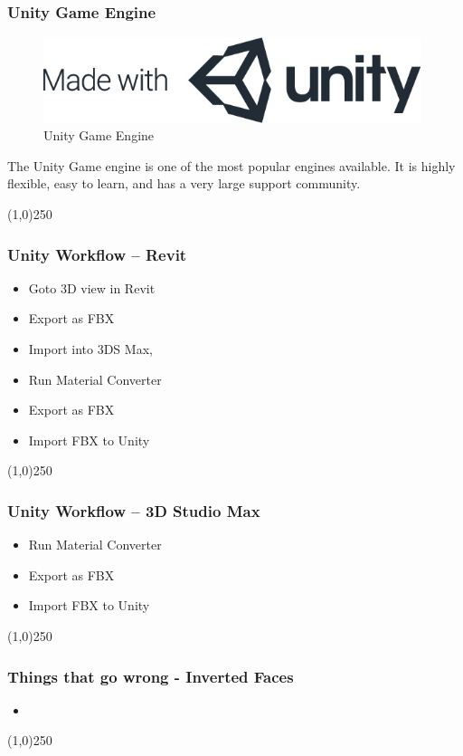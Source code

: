 \begin{frame}
\frametitle{Unity Game Engine}
\begin{figure}
	\centering
	\includegraphics[height=2.5cm]{./img/Unity/mwu-logo.jpg}
	\caption[Unity Game Engine]{Unity Game Engine}
	\label{fig:mwulogo}
\end{figure}
The Unity Game engine is one of the most popular engines available.  It is highly flexible, easy to learn, and has a very large support community.
\end{frame}
\begin{center}\line(1,0){250}\end{center}



\begin{frame}
\frametitle{Unity Workflow -- Revit}
\begin{itemize}
	\item Goto 3D view in Revit
	\item Export as FBX
	\item Import into 3DS Max,
	\item Run Material Converter
	\item Export as FBX
	\item Import FBX to Unity
\end{itemize}
\end{frame}
\begin{center}\line(1,0){250}\end{center}


\begin{frame}
\frametitle{Unity Workflow -- 3D Studio Max}
\begin{itemize}
	\item Run Material Converter
	\item Export as FBX
	\item Import FBX to Unity
\end{itemize}
\end{frame}
\begin{center}\line(1,0){250}\end{center}





\begin{frame}
\frametitle{Things that go wrong - Inverted Faces }
\begin{figure}
	\centering
	\caption[]{}
	\label{fig:}
\end{figure}
\begin{itemize}
	\item 
\end{itemize}
\end{frame}
\begin{center}\line(1,0){250}\end{center}


